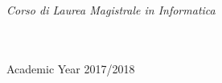 \documentclass[
11pt, %
english, %
singlespacing, %
headsepline, %
]{MastersDoctoralThesis} %
\begin{document}
\begin{titlepage}
\begin{center}
			\vfill
			
			\large \textit{Corso di Laurea Magistrale in Informatica}\\[0.3cm] %
			\textit{}\\[0.4cm]
			\deptname\\[2cm] %
			
			\vfill
			
			{\large Academic Year 2017/2018}\\[4cm] %
			
			\vfill
		\end{center}
	\end{titlepage}
	
	
	
	
	
	
	
\end{document}
